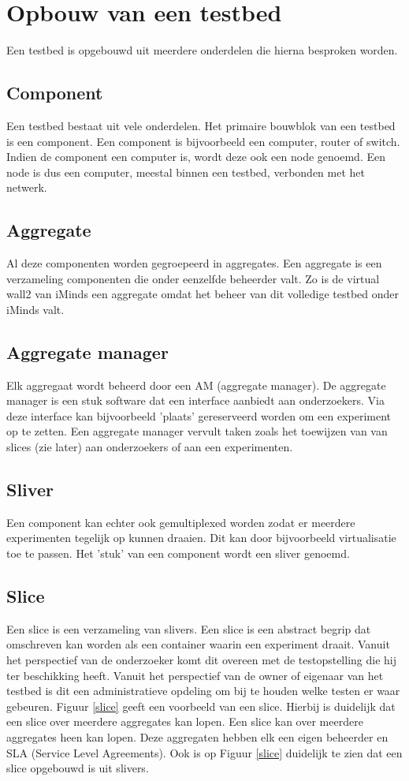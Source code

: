 \section{Opbouw van een testbed}
Een testbed is opgebouwd uit meerdere onderdelen die hierna besproken worden.

\subsection{Component}
\npar
Een testbed bestaat uit vele onderdelen. Het primaire bouwblok van een testbed is een component. Een component is bijvoorbeeld een computer, router of switch. Indien de component een computer is, wordt deze ook een node genoemd. Een node is dus een computer, meestal binnen een testbed, verbonden met het netwerk. 
\subsection{Aggregate}
\npar
Al deze componenten worden gegroepeerd in aggregates. Een aggregate is een verzameling componenten die onder eenzelfde beheerder valt. Zo is de virtual wall2 van iMinds een aggregate omdat het beheer van dit volledige testbed onder iMinds valt.
\clearpage
\subsection{Aggregate manager}
\npar
Elk aggregaat wordt beheerd door een AM (aggregate manager). De aggregate manager is een stuk software dat een interface aanbiedt aan onderzoekers. Via deze interface kan bijvoorbeeld 'plaats' gereserveerd worden om een experiment op te zetten. Een aggregate manager vervult taken zoals het toewijzen van van slices (zie later) aan onderzoekers of aan een experimenten.
\subsection{Sliver}
\npar
Een component kan echter ook gemultiplexed worden zodat er meerdere experimenten tegelijk op kunnen draaien. Dit kan door bijvoorbeeld virtualisatie toe te passen. Het 'stuk' van een component wordt een sliver genoemd.
\subsection{Slice}
\npar
Een slice is een verzameling van slivers. Een slice is een abstract begrip dat omschreven kan worden als een container waarin een experiment draait. Vanuit het perspectief van de onderzoeker komt dit overeen met de testopstelling die hij ter beschikking heeft. Vanuit het perspectief van de owner of eigenaar van het testbed is dit een administratieve opdeling om bij te houden welke testen er waar gebeuren. Figuur \ref{slice} geeft een voorbeeld van een slice. Hierbij is duidelijk dat een slice over meerdere aggregates kan lopen.  Een slice kan over meerdere aggregates heen kan lopen. Deze aggregaten hebben elk een eigen beheerder en SLA (Service Level Agreements). Ook is op Figuur \ref{slice} duidelijk te zien dat een slice opgebouwd is uit slivers.
\clearpage
